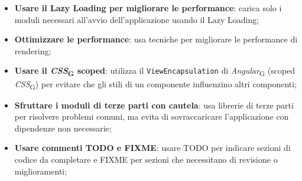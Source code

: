 \begin{itemize}
    \item \textbf{Usare il Lazy Loading per migliorare le performance}: carica solo i moduli necessari all’avvio dell’applicazione usando il Lazy Loading;
    \item \textbf{Ottimizzare le performance}: usa tecniche per migliorare le performance di rendering;
    \item \textbf{Usare il \textit{CSS}\textsubscript{G} scoped}: utilizza il \texttt{ViewEncapsulation} di \textit{Angular}\textsubscript{G} (scoped \textit{CSS}\textsubscript{G}) per evitare che gli stili di un componente influenzino altri componenti;
    \item \textbf{Sfruttare i moduli di terze parti con cautela}: usa librerie di terze parti per risolvere problemi comuni, ma evita di sovraccaricare l'applicazione con dipendenze non necessarie;
    \item \textbf{Usare commenti TODO e FIXME}: usare TODO per indicare sezioni di codice da completare e FIXME per sezioni che necessitano di revisione o miglioramenti;
\end{itemize}

